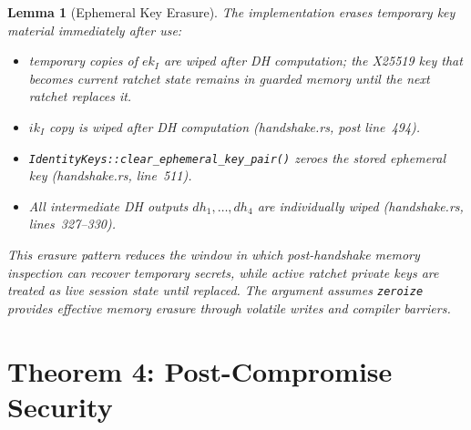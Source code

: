 \documentclass[11pt,a4paper]{article}
\newtheorem{lemma}[theorem]{Lemma}
\theoremstyle{definition}
\theoremstyle{remark}
\begin{document}
\begin{lemma}[Ephemeral Key Erasure]
\label{lem:eph-erasure}
The implementation erases temporary key material immediately after use:
\begin{itemize}[nosep]
  \item temporary copies of $ek_I$ are wiped after DH computation; the X25519
        key that becomes current ratchet state remains in guarded memory until
        the next ratchet replaces it.
  \item $ik_I$ copy is wiped after DH computation
        \emph{(handshake.rs, post line~494)}.
  \item \texttt{IdentityKeys::clear\_ephemeral\_key\_pair()} zeroes the
        stored ephemeral key \emph{(handshake.rs, line~511)}.
  \item All intermediate DH outputs $\mathit{dh}_1, \ldots, \mathit{dh}_4$
        are individually wiped \emph{(handshake.rs, lines~327--330)}.
\end{itemize}
This erasure pattern reduces the window in which post-handshake memory
inspection can recover temporary secrets, while active ratchet private keys are
treated as live session state until replaced. The argument assumes
\texttt{zeroize} provides effective memory erasure through volatile writes and
compiler barriers.
\end{lemma}


\section{Theorem 4: Post-Compromise Security}
\label{sec:thm4}
\end{document}
